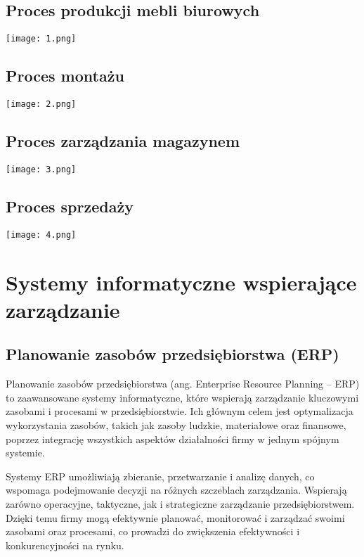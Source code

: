 \subsection{Proces produkcji mebli biurowych}
\begin{center}
    \texttt{[image: 1.png]}\\[0.5cm]
\end{center}
\subsection{Proces montażu}
\begin{center}
    \texttt{[image: 2.png]}\\[0.5cm]
\end{center}
\subsection{Proces zarządzania magazynem}
\begin{center}
    \texttt{[image: 3.png]}\\[0.5cm]
\end{center}
\subsection{Proces sprzedaży}
\begin{center}
    \texttt{[image: 4.png]}\\[0.5cm]
\end{center}

\section{Systemy informatyczne wspierające zarządzanie}
\subsection{Planowanie zasobów przedsiębiorstwa (ERP)}

Planowanie zasobów przedsiębiorstwa (ang. Enterprise Resource Planning – ERP) to zaawansowane systemy informatyczne, które wspierają zarządzanie kluczowymi zasobami i procesami w przedsiębiorstwie. Ich głównym celem jest optymalizacja wykorzystania zasobów, takich jak zasoby ludzkie, materiałowe oraz finansowe, poprzez integrację wszystkich aspektów działalności firmy w jednym spójnym systemie.

Systemy ERP umożliwiają zbieranie, przetwarzanie i analizę danych, co wspomaga podejmowanie decyzji na różnych szczeblach zarządzania. Wspierają zarówno operacyjne, taktyczne, jak i strategiczne zarządzanie przedsiębiorstwem. Dzięki temu firmy mogą efektywnie planować, monitorować i zarządzać swoimi zasobami oraz procesami, co prowadzi do zwiększenia efektywności i konkurencyjności na rynku.

